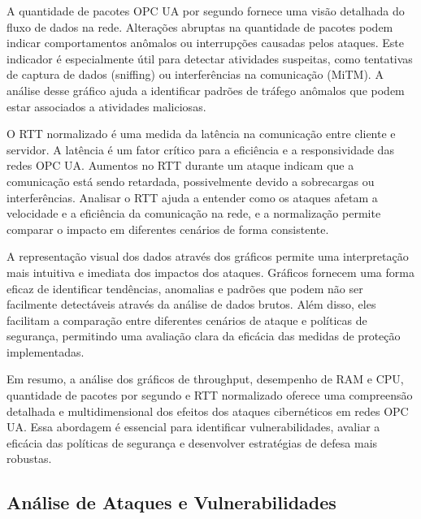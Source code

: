 {    A quantidade de pacotes OPC UA por segundo fornece uma visão detalhada do fluxo de dados na rede. Alterações abruptas na quantidade de pacotes podem indicar comportamentos anômalos ou interrupções causadas pelos ataques. Este indicador é especialmente útil para detectar atividades suspeitas, como tentativas de captura de dados (sniffing) ou interferências na comunicação (MiTM). A análise desse gráfico ajuda a identificar padrões de tráfego anômalos que podem estar associados a atividades maliciosas.

    O RTT normalizado é uma medida da latência na comunicação entre cliente e servidor. A latência é um fator crítico para a eficiência e a responsividade das redes OPC UA. Aumentos no RTT durante um ataque indicam que a comunicação está sendo retardada, possivelmente devido a sobrecargas ou interferências. Analisar o RTT ajuda a entender como os ataques afetam a velocidade e a eficiência da comunicação na rede, e a normalização permite comparar o impacto em diferentes cenários de forma consistente.

    A representação visual dos dados através dos gráficos permite uma interpretação mais intuitiva e imediata dos impactos dos ataques. Gráficos fornecem uma forma eficaz de identificar tendências, anomalias e padrões que podem não ser facilmente detectáveis através da análise de dados brutos. Além disso, eles facilitam a comparação entre diferentes cenários de ataque e políticas de segurança, permitindo uma avaliação clara da eficácia das medidas de proteção implementadas.

    Em resumo, a análise dos gráficos de throughput, desempenho de RAM e CPU, quantidade de pacotes por segundo e RTT normalizado oferece uma compreensão detalhada e multidimensional dos efeitos dos ataques cibernéticos em redes OPC UA. Essa abordagem é essencial para identificar vulnerabilidades, avaliar a eficácia das políticas de segurança e desenvolver estratégias de defesa mais robustas.
    }

    \subsection{Análise de Ataques e Vulnerabilidades}

